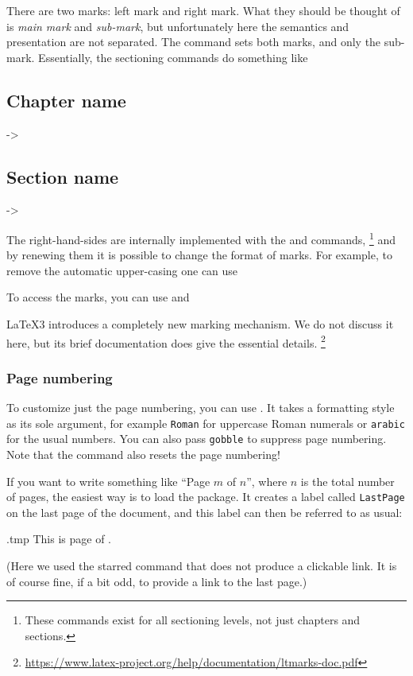 There are two marks: left mark and right mark.
What they should be thought of is \emph{main mark} and \emph{sub-mark},
but unfortunately here the semantics and presentation are not separated.
The  command sets both marks, and  only the sub-mark.
Essentially, the sectioning commands do something like
%
\begin{ExampleCode}
\chapter{Chapter name} -> 
\section{Section name} -> 
\end{ExampleCode}
%
The right-hand-sides are internally implemented with the  and  commands,%
\footnote{These commands exist for all sectioning levels, not just chapters and sections.}
and by renewing them it is possible to change the format of marks.
For example, to remove the automatic upper-casing one can use
%
\begin{ExampleCode}
\renewcommand{\chaptermark}[1]{\markboth{\chaptername~\thechapter. #1}{}}
\renewcommand{\sectionmark}[1]{\markright{\thesection. #1}}
\end{ExampleCode}
%
To access the marks, you can use  and 


\begin{latexthree}
\LaTeX3 introduces a completely new marking mechanism.
We do not discuss it here, but its brief documentation does give the essential details.%
\footnote{\url{https://www.latex-project.org/help/documentation/ltmarks-doc.pdf}}
\end{latexthree}


%
%
\subsection{Page numbering}

To customize just the page numbering, you can use .
It takes a formatting style as its sole argument, for example \verb|Roman|
for uppercase Roman numerals or \verb|arabic| for the usual numbers.
You can also pass \verb|gobble| to suppress page numbering.
Note that the command also resets the page numbering!

If you want to write something like ``Page $m$ of $n$'', where $n$ is the total number of pages,
the easiest way is to load the  package.
It creates a label called \verb|LastPage| on the last page of the document,
and this label can then be referred to as usual:
%
\begin{VerbatimOut}{\jobname.tmp}
This is page
\thepage{} of \pageref*{LastPage}.
\end{VerbatimOut}
\ShowExample
%
(Here we used the starred  command that does not produce a clickable link.
It is of course fine, if a bit odd, to provide a link to the last page.)

